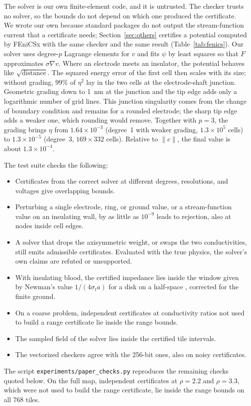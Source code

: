 \documentclass[11pt]{article}
\newcommand{\norm}[1]{\lVert #1\rVert}
\begin{document}
The solver is our own finite-element code, and it is untrusted. The checker
trusts no solver, so the bounds do not depend on which one produced the
certificate. We wrote our own because standard packages do not output the
stream-function current that a certificate needs; Section~\ref{sec:others}
certifies a potential computed by FEniCSx with the same checker and the same
result (Table~\ref{tab:fenics}). Our solver uses degree-$p$ Lagrange elements for
$v$ and fits $\psi$ by least squares so that $F$ approximates $\sigma\nabla v$. Where an electrode meets an insulator, the potential behaves
like $\sqrt{\text{distance}}$. The squared energy error of the first cell then
scales with its size; without grading, 99\% of $\eta^2$ lay in the two cells at the
electrode-shaft junction. Geometric grading down to \SI{1}{nm} at the junction and the tip edge
adds only a logarithmic number of grid lines. This junction singularity comes from the
change of boundary condition and remains for a rounded electrode; the sharp tip edge
adds a weaker one, which rounding would remove.
Together with $p=3$, the grading brings $\eta$ from $1.64\times10^{-3}$ (degree~1 with
weaker grading, $1.3\times10^5$ cells) to $1.3\times10^{-5}$ (degree~3,
$169\times332$ cells). Relative to $\norm{c}$, the final value is about
$1.3\times10^{-4}$.

The test suite checks the following:
\begin{itemize}
\item Certificates from the correct solver at different degrees, resolutions, and voltages give
overlapping bounds.
\item Perturbing a single electrode, ring, or ground value, or a stream-function
value on an insulating wall, by as little as $10^{-9}$ leads to rejection,
also at nodes inside cell edges.
\item A solver that drops the axisymmetric weight, or swaps the two
conductivities, still emits admissible certificates. Evaluated with the true
physics, the solver's own claims are refuted or unsupported.
\item With insulating blood, the certified impedance lies inside the window
given by Newman's value $1/(4\sigma_t a)$ for a disk on a half-space
\cite{newman1966}, corrected for the finite ground.
\item On a coarse problem, independent certificates at conductivity ratios not
used to build a range certificate lie inside the range bounds.
\item The sampled field of the solver lies inside the certified tile intervals.
\item The vectorized checkers agree with the 256-bit ones, also on noisy certificates.
\end{itemize}
The script \texttt{experiments/paper\_checks.py} reproduces the remaining checks
quoted below. On the full map, independent certificates at $\rho=2.2$ and
$\rho=3.3$, which were not used to build the range certificate, lie inside the
range bounds on all 768 tiles.
\end{document}
